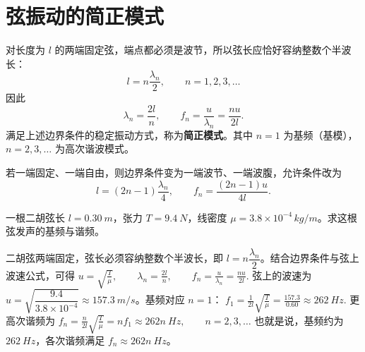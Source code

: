 
\section{弦振动的简正模式}

\begin{definition}[简正模式]
对长度为 \(l\) 的两端固定弦，端点都必须是波节，所以弦长应恰好容纳整数个半波长：
\[
l=n\frac{\lambda_n}{2},\qquad n=1,2,3,\dots
\]
因此
\[
\lambda_n=\frac{2l}{n},\qquad f_n=\frac{u}{\lambda_n}=\frac{nu}{2l}.
\]
满足上述边界条件的稳定振动方式，称为\textbf{简正模式}。其中 \(n=1\) 为基频（基模），\(n=2,3,\dots\) 为高次谐波模式。

若一端固定、一端自由，则边界条件变为一端波节、一端波腹，允许条件改为
\[
l=(2n-1)\frac{\lambda_n}{4},\qquad f_n=\frac{(2n-1)u}{4l}.
\]
\end{definition}

\begin{exercise}[二胡弦的基频和谐频怎样由边界条件决定]
一根二胡弦长 \(l=\SI{0.30}{m}\)，张力 \(T=\SI{9.4}{N}\)，线密度 \(\mu=3.8\times10^{-4}\,\si{kg/m}\)。求这根弦发声的基频与谐频。
\end{exercise}

\begin{solution}
二胡弦两端固定，弦长必须容纳整数个半波长，即 \(l=n\dfrac{\lambda_n}{2}\)。结合边界条件与弦上波速公式，可得
 \(u=\sqrt{\frac{T}{\mu}},\qquad \lambda_n=\frac{2l}{n},\qquad f_n=\frac{u}{\lambda_n}=\frac{nu}{2l}.\) 
弦上的波速为 \(u=\sqrt{\dfrac{9.4}{3.8\times10^{-4}}}\approx \SI{157.3}{m/s}\)。基频对应 \(n=1\)：
 \(f_1=\frac{1}{2l}\sqrt{\frac{T}{\mu}} =\frac{157.3}{0.60} \approx \SI{262}{Hz}.\) 
更高次谐频为
 \(f_n=\frac{n}{2l}\sqrt{\frac{T}{\mu}} =n f_1 \approx 262n\ \si{Hz},\qquad n=2,3,\dots\) 
也就是说，基频约为 \(\SI{262}{Hz}\)，各次谐频满足 \(f_n\approx 262n\ \si{Hz}\)。
\end{solution}
